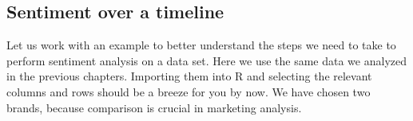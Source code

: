 \subsection{Sentiment over a timeline}\label{sentiment-over-a-timeline}

Let us work with an example to better understand the steps we need to take to perform
sentiment analysis on a data set. Here we use the same data we analyzed in the
previous chapters. Importing them into R and selecting the relevant
columns and rows should be a breeze for you by now. We have chosen two brands,
because comparison is crucial in marketing analysis.

\begin{Shaded}
\begin{Highlighting}[]

\NormalTok{(} \NormalTok{)}

\OtherTok{\textless{}{-}} \NormalTok{(}\NormalTok{)}

\OtherTok{\textless{}{-}}\NormalTok{ prodreviews[, }\NormalTok{(}\NormalTok{, }\NormalTok{, }
                        \NormalTok{, }\NormalTok{)]}

\SpecialCharTok{$}\OtherTok{\textless{}{-}} \SpecialCharTok{$}

\OtherTok{\textless{}{-}}  \NormalTok{(}\NormalTok{, }\NormalTok{, }\NormalTok{))}
\end{Highlighting}
\end{Shaded}

